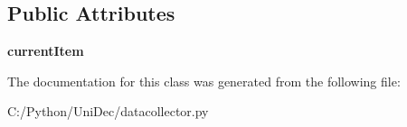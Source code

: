 \subsection*{Public Attributes}
\begin{DoxyCompactItemize}
\item 
\hypertarget{class_uni_dec_1_1datacollector_1_1_x_list_ctrl_ad8650f388ab7d1f39fb02fef2c57832a}{}{\bfseries current\+Item}\label{class_uni_dec_1_1datacollector_1_1_x_list_ctrl_ad8650f388ab7d1f39fb02fef2c57832a}

\end{DoxyCompactItemize}


The documentation for this class was generated from the following file\+:\begin{DoxyCompactItemize}
\item 
C\+:/\+Python/\+Uni\+Dec/datacollector.\+py\end{DoxyCompactItemize}
